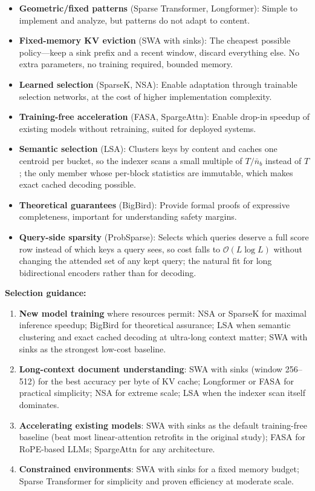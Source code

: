 \begin{itemize}[leftmargin=*]
    \item \textbf{Geometric/fixed patterns} (Sparse Transformer, Longformer): Simple to implement and analyze, but patterns do not adapt to content.
    \item \textbf{Fixed-memory KV eviction} (SWA with sinks): The cheapest possible policy---keep a sink prefix and a recent window, discard everything else. No extra parameters, no training required, bounded memory.
    \item \textbf{Learned selection} (SparseK, NSA): Enable adaptation through trainable selection networks, at the cost of higher implementation complexity.
    \item \textbf{Training-free acceleration} (FASA, SpargeAttn): Enable drop-in speedup of existing models without retraining, suited for deployed systems.
    \item \textbf{Semantic selection} (LSA): Clusters keys by content and caches one centroid per bucket, so the indexer scans a small multiple of $T/\bar{n}_b$ instead of $T$; the only member whose per-block statistics are immutable, which makes exact cached decoding possible.
    \item \textbf{Theoretical guarantees} (BigBird): Provide formal proofs of expressive completeness, important for understanding safety margins.
    \item \textbf{Query-side sparsity} (ProbSparse): Selects which queries deserve a full score row instead of which keys a query sees, so cost falls to $\mathcal{O}(L\log L)$ without changing the attended set of any kept query; the natural fit for long bidirectional encoders rather than for decoding.
\end{itemize}

\textbf{Selection guidance:}
\begin{enumerate}[leftmargin=*]
    \item \textbf{New model training} where resources permit: NSA or SparseK for maximal inference speedup; BigBird for theoretical assurance; LSA when semantic clustering and exact cached decoding at ultra-long context matter; SWA with sinks as the strongest low-cost baseline.
    \item \textbf{Long-context document understanding}: SWA with sinks (window 256--512) for the best accuracy per byte of KV cache; Longformer or FASA for practical simplicity; NSA for extreme scale; LSA when the indexer scan itself dominates.
    \item \textbf{Accelerating existing models}: SWA with sinks as the default training-free baseline (beat most linear-attention retrofits in the original study); FASA for RoPE-based LLMs; SpargeAttn for any architecture.
    \item \textbf{Constrained environments}: SWA with sinks for a fixed memory budget; Sparse Transformer for simplicity and proven efficiency at moderate scale.
\end{enumerate}

